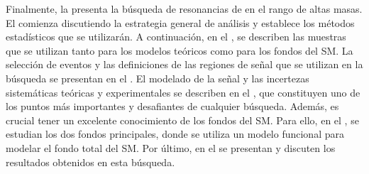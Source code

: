Finalmente, la \Part{\ref{part:search}} presenta la búsqueda de resonancias de \gammajet en el rango de altas masas. El \Ch{\ref{ch:strategy}} comienza discutiendo la estrategia general de análisis y establece los métodos estadísticos que se utilizarán. A continuación, en el \Ch{\ref{ch:samples}}, se describen las muestras que se utilizan tanto para los modelos teóricos como para los fondos del \ac{SM}. La selección de eventos y las definiciones de las regiones de señal que se utilizan en la búsqueda se presentan en el \Ch{\ref{ch:evt_selection}}. El modelado de la señal y las incertezas sistemáticas teóricas y experimentales se describen en el \Ch{\ref{ch:signals}}, que constituyen uno de los puntos más importantes y desafiantes de cualquier búsqueda. Adem\'as, es crucial tener un excelente conocimiento de los fondos del \ac{SM}. Para ello, en el \Ch{\ref{ch:bkg}}, se estudian los dos fondos principales, donde se utiliza un modelo funcional para modelar el fondo total del \ac{SM}. Por último, en el \Ch{\ref{ch:results}} se presentan y discuten los resultados obtenidos en esta búsqueda.